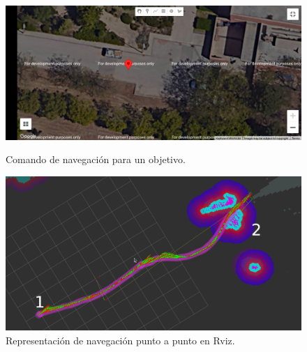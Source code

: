 \begin{figure}[htbp]
  \centering
  \begin{minipage}[b]{0.5\textwidth}
    \centering
    \includegraphics[width=\textwidth]{images/comando_punto.jpeg}
    \caption{Comando de navegación para un objetivo.}
    \label{fig:navegacion_punto_punto_web}
  \end{minipage}
  \hfill
  \begin{minipage}[b]{0.45\textwidth}
    \centering
    \includegraphics[width=\textwidth]{images/1_punto_naevegacion.png}
    \caption{Representación de navegación punto a punto en Rviz.}
    \label{fig:navegacion_punto_punto_rviz}
  \end{minipage}
\end{figure}

